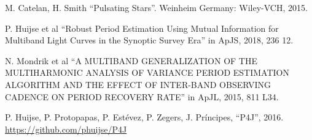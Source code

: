 \clearpage %
\begin{references}
	M. Catelan, H. Smith ``Pulsating Stars''. Weinheim Germany: Wiley-VCH, 2015.
	
	P. Huijse et al ``Robust Period Estimation Using Mutual Information for Multiband Light Curves in the Synoptic Survey Era'' in ApJS, 2018, 236 12.
	
	N. Mondrik et al ``A MULTIBAND GENERALIZATION OF THE MULTIHARMONIC ANALYSIS OF VARIANCE PERIOD ESTIMATION ALGORITHM AND THE EFFECT OF INTER-BAND OBSERVING CADENCE ON PERIOD RECOVERY RATE'' in ApJL, 2015, 811 L34.
	
	P. Huijse, P. Protopapas, P. Estévez, P. Zegers, J. Príncipes, ``P4J'', 2016. \\
	\url{https://github.com/phuijse/P4J}

    
\end{references}
